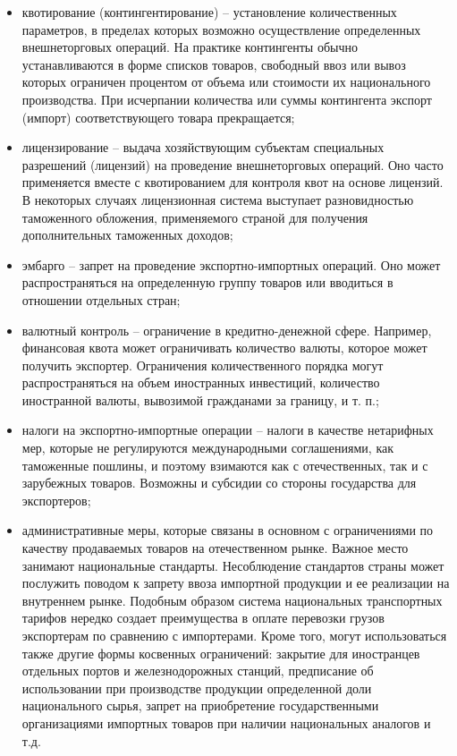 \begin{enumerate}
    \begin{itemize}
        \item квотирование (контингентирование) -- установление количественных
        параметров, в пределах которых возможно осуществление определенных
        внешнеторговых операций. На практике контингенты обычно устанавливаются
        в форме списков товаров, свободный ввоз или вывоз которых ограничен
        процентом от объема или стоимости их национального производства. При
        исчерпании количества или суммы контингента экспорт (импорт)
        соответствующего товара прекращается;
        \item лицензирование -- выдача хозяйствующим субъектам специальных
        разрешений (лицензий) на проведение внешнеторговых операций. Оно часто
        применяется вместе с квотированием для контроля квот на основе
        лицензий. В некоторых случаях лицензионная система выступает
        разновидностью таможенного обложения, применяемого страной для
        получения дополнительных таможенных доходов;
        \item эмбарго -- запрет на проведение экспортно-импортных операций. Оно
        может распространяться на определенную группу товаров или вводиться в
        отношении отдельных стран;
        \item валютный контроль -- ограничение в кредитно-денежной сфере.
        Например, финансовая квота может ограничивать количество валюты,
        которое может получить экспортер. Ограничения количественного порядка
        могут распространяться на объем иностранных инвестиций, количество
        иностранной валюты, вывозимой гражданами за границу, и т. п.;
        \item налоги на экспортно-импортные операции -- налоги в качестве
        нетарифных мер, которые не регулируются международными соглашениями,
        как таможенные пошлины, и поэтому взимаются как с отечественных, так и
        с зарубежных товаров. Возможны и субсидии со стороны государства для
        экспортеров;
        \item административные меры, которые связаны в основном с ограничениями
        по качеству продаваемых товаров на отечественном рынке. Важное место
        занимают национальные стандарты. Несоблюдение стандартов страны может
        послужить поводом к запрету ввоза импортной продукции и ее реализации
        на внутреннем рынке. Подобным образом система национальных транспортных
        тарифов нередко создает преимущества в оплате перевозки грузов
        экспортерам по сравнению с импортерами. Кроме того, могут
        использоваться также другие формы косвенных ограничений: закрытие для
        иностранцев отдельных портов и железнодорожных станций, предписание об
        использовании при производстве продукции определенной доли
        национального сырья, запрет на приобретение государственными
        организациями импортных товаров при наличии национальных аналогов и т.д.
    \end{itemize}


\end{enumerate}
